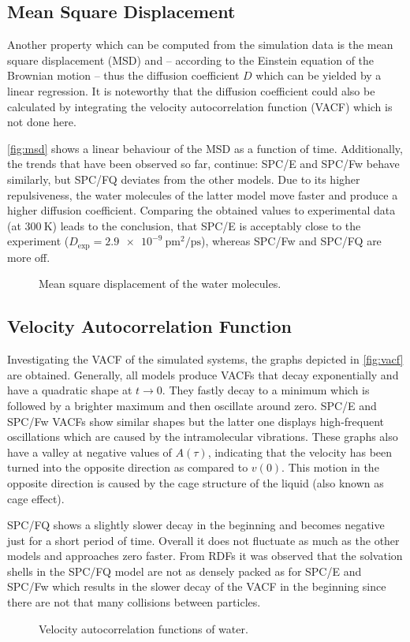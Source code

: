 \documentclass[a4paper,12pt]{scrartcl}
\newcommand{\m}[1]{\mathrm{#1}}
\begin{document}
	\subsection{Mean Square Displacement}
		Another property which can be computed from the simulation data is the mean square displacement (MSD) and -- according to the Einstein equation of the Brownian motion -- thus the diffusion coefficient $ D $ which can be yielded by a linear regression. It is noteworthy that the diffusion coefficient could also be calculated by integrating the velocity autocorrelation function (VACF) which is not done here.
		
		\autoref{fig:msd} shows a linear behaviour of the MSD as a function of time. Additionally, the trends that have been observed so far, continue: SPC/E and SPC/Fw behave similarly, but SPC/FQ deviates from the other models. Due to its higher repulsiveness, the water molecules of the latter model move faster and produce a higher diffusion coefficient. Comparing the obtained values to experimental data\autocite{krynicki1978pressure} (at $ \SI{300}{\kelvin} $) leads to the conclusion, that SPC/E is acceptably close to the experiment ($ D_\m{exp} = \SI{2.9e-9}{\pico\meter^2\per\pico\second}$), whereas SPC/Fw and SPC/FQ are more off.
		\begin{figure}
			\centering
			
			\vspace{-20pt}
			\caption{Mean square displacement of the water molecules.}
			\label{fig:msd}
		\end{figure}
	\subsection{Velocity Autocorrelation Function}
		Investigating the VACF of the simulated systems, the graphs depicted in \autoref{fig:vacf} are obtained. Generally, all models produce VACFs that decay exponentially and have a quadratic shape at $ t \rightarrow 0 $. They fastly decay to a minimum which is followed by a brighter maximum and then oscillate around zero. SPC/E and SPC/Fw VACFs show similar shapes but the latter one displays high-frequent oscillations which are caused by the intramolecular vibrations. These graphs also have a valley at negative values of $ A(\tau) $, indicating that the velocity has been turned into the opposite direction as compared to $ v(0) $. This motion in the opposite direction is caused by the cage structure of the liquid (also known as cage effect).
		
		SPC/FQ shows a slightly slower decay in the beginning and becomes negative just for a short period of time. Overall it does not fluctuate as much as the other models and approaches zero faster. From RDFs it was observed that the solvation shells in the SPC/FQ model are not as densely packed as for SPC/E and SPC/Fw which results in the slower decay of the VACF in the beginning since there are not that many collisions between particles.
		\begin{figure}
			\centering
			
			\vspace{-20pt}
			\caption{Velocity autocorrelation functions of water.}
			\label{fig:vacf}
		\end{figure}
\end{document}
